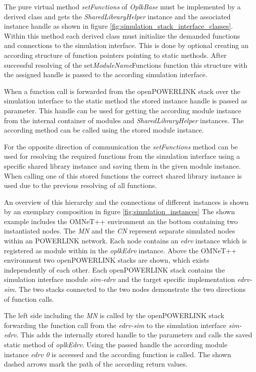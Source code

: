 The pure virtual method \emph{setFunctions} of \emph{OplkBase} must be implemented by a derived class and gets the \emph{SharedLibraryHelper} instance and the associated instance handle as shown in  figure \ref{fig:simulation_stack_interface_classes}.
Within this method each derived class must initialize the demanded functions and connections to the simulation interface.
This is done by optional creating an according structure of function pointers pointing to static methods.
After successful resolving of the set\emph{ModuleName}Functions function this structure with the assigned handle is passed to the according simulation interface.

When a function call is forwarded from the openPOWERLINK stack over the simulation interface to the static method the stored instance handle is passed as parameter.
This handle can be used for getting the according module instance from the internal container of modules and \emph{SharedLibraryHelper} instances.
The according method can be called using the stored module instance.

For the opposite direction of communication the \emph{setFunctions} method can be used for resolving the required functions from the simulation interface using a specific shared library instance and saving them in the given module instance.
When calling one of this stored functions the correct shared library instance is used due to the previous resolving of all functions.

An overview of this hierarchy and the connections of different instances is shown by an exemplary composition in figure \ref{fig:simulation_instances}
The shown example includes the OMNeT++ environment an the bottom containing two instantiated nodes.
The \emph{MN} and the \emph{CN} represent separate simulated nodes within an POWERLINK network.
Each node contains an \emph{edrv} instance which is registered as module within in the \emph{oplkEdrv} instance.
Above the OMNeT++ environment two openPOWERLINK stacks are shown, which exists independently of each other.
Each openPOWERLINK stack contains the simulation interface module \emph{sim-edrv} and the target specific implementation \emph{edrv-sim}.
The two stacks connected to the two nodes demonstrate the two directions of function calls.

The left side including the \emph{MN} is called by the openPOWERLINK stack forwarding the function call from the \emph{edrv-sim} to the simulation interface \emph{sim-edrv}.
This adds the internally stored handle to the parameters and calls the saved static method of \emph{oplkEdrv}.
Using the passed handle the according module instance \emph{edrv 0} is accessed and the according function is called.
The shown dashed arrows mark the path of the according return values.

